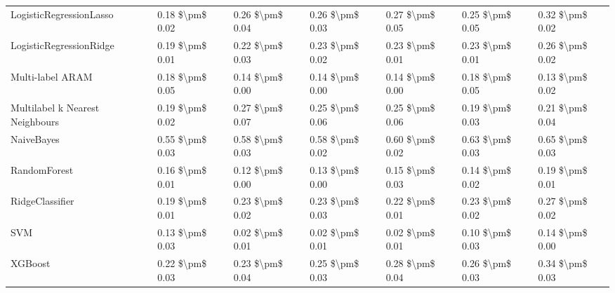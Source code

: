 \begin{tabular}{lllllll}
        LogisticRegressionLasso & 0.18 \$\textbackslash pm\$ 0.02 &           0.26 \$\textbackslash pm\$ 0.04 &       0.26 \$\textbackslash pm\$ 0.03 &        0.27 \$\textbackslash pm\$ 0.05 &                         0.25 \$\textbackslash pm\$ 0.05 &     0.32 \$\textbackslash pm\$ 0.02 \\
        LogisticRegressionRidge & 0.19 \$\textbackslash pm\$ 0.01 &           0.22 \$\textbackslash pm\$ 0.03 &       0.23 \$\textbackslash pm\$ 0.02 &        0.23 \$\textbackslash pm\$ 0.01 &                         0.23 \$\textbackslash pm\$ 0.01 &     0.26 \$\textbackslash pm\$ 0.02 \\
               Multi-label ARAM & 0.18 \$\textbackslash pm\$ 0.05 &           0.14 \$\textbackslash pm\$ 0.00 &       0.14 \$\textbackslash pm\$ 0.00 &        0.14 \$\textbackslash pm\$ 0.00 &                         0.18 \$\textbackslash pm\$ 0.05 &     0.13 \$\textbackslash pm\$ 0.02 \\
Multilabel k Nearest Neighbours & 0.19 \$\textbackslash pm\$ 0.02 &           0.27 \$\textbackslash pm\$ 0.07 &       0.25 \$\textbackslash pm\$ 0.06 &        0.25 \$\textbackslash pm\$ 0.06 &                         0.19 \$\textbackslash pm\$ 0.03 &     0.21 \$\textbackslash pm\$ 0.04 \\
                     NaiveBayes & 0.55 \$\textbackslash pm\$ 0.03 &           0.58 \$\textbackslash pm\$ 0.03 &       0.58 \$\textbackslash pm\$ 0.02 &        0.60 \$\textbackslash pm\$ 0.02 &                         0.63 \$\textbackslash pm\$ 0.03 &     0.65 \$\textbackslash pm\$ 0.03 \\
                   RandomForest & 0.16 \$\textbackslash pm\$ 0.01 &           0.12 \$\textbackslash pm\$ 0.00 &       0.13 \$\textbackslash pm\$ 0.00 &        0.15 \$\textbackslash pm\$ 0.03 &                         0.14 \$\textbackslash pm\$ 0.02 &     0.19 \$\textbackslash pm\$ 0.01 \\
                RidgeClassifier & 0.19 \$\textbackslash pm\$ 0.01 &           0.23 \$\textbackslash pm\$ 0.02 &       0.23 \$\textbackslash pm\$ 0.03 &        0.22 \$\textbackslash pm\$ 0.01 &                         0.23 \$\textbackslash pm\$ 0.02 &     0.27 \$\textbackslash pm\$ 0.02 \\
                            SVM & 0.13 \$\textbackslash pm\$ 0.03 &           0.02 \$\textbackslash pm\$ 0.01 &       0.02 \$\textbackslash pm\$ 0.01 &        0.02 \$\textbackslash pm\$ 0.01 &                         0.10 \$\textbackslash pm\$ 0.03 &     0.14 \$\textbackslash pm\$ 0.00 \\
                        XGBoost & 0.22 \$\textbackslash pm\$ 0.03 &           0.23 \$\textbackslash pm\$ 0.04 &       0.25 \$\textbackslash pm\$ 0.03 &        0.28 \$\textbackslash pm\$ 0.04 &                         0.26 \$\textbackslash pm\$ 0.03 &     0.34 \$\textbackslash pm\$ 0.03 \\
\bottomrule
\end{tabular}
